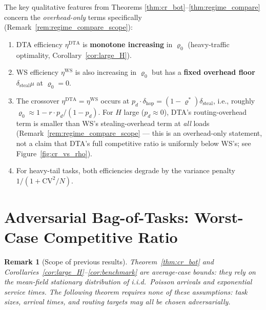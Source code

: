 \documentclass[11pt,a4paper]{article}
\newtheorem{remark}{Remark}[section]
\begin{document}
The key qualitative features from Theorems \ref{thm:cr_bot}--\ref{thm:regime_compare}
concern the \emph{overhead-only} terms specifically (Remark~\ref{rem:regime_compare_scope}):
\begin{enumerate}
  \item DTA efficiency $\eta^{\mathrm{DTA}}$ is \textbf{monotone increasing} in $\varrho_0$
        (heavy-traffic optimality, Corollary~\ref{cor:large_H}).
  \item WS efficiency $\eta^{\mathrm{WS}}$ is also increasing in $\varrho_0$
        but has a \textbf{fixed overhead floor} $\delta_{\mathrm{steal}}\mu$ at $\varrho_0 = 0$.
  \item The crossover $\eta^{\mathrm{DTA}} = \eta^{\mathrm{WS}}$ occurs at
        $p_d \cdot \delta_{\mathrm{hop}} = (1-\varrho^*)\delta_{\mathrm{steal}}$,
        i.e., roughly $\varrho_0 \approx 1 - r\cdot p_d/(1-p_d)$.
        For $H$ large ($p_d \approx 0$), DTA's routing-overhead term is smaller
        than WS's stealing-overhead term at \emph{all} loads (Remark~\ref{rem:regime_compare_scope}
        --- this is an overhead-only statement, not a claim that DTA's full
        competitive ratio is uniformly below WS's; see Figure~\ref{fig:cr_vs_rho}).
  \item For heavy-tail tasks, both efficiencies degrade by the variance penalty $1/(1+\mathrm{CV}^2/N)$.
\end{enumerate}


\section{Adversarial Bag-of-Tasks: Worst-Case Competitive Ratio}
\label{sec:cr_bot_worst}

\begin{remark}[Scope of previous results]
Theorem~\ref{thm:cr_bot} and Corollaries~\ref{cor:large_H}--\ref{cor:benchmark}
are \emph{average-case} bounds: they rely on the mean-field stationary
distribution of i.i.d.\ Poisson arrivals and exponential service times.
The following theorem requires \emph{none} of these assumptions: task sizes,
arrival times, and routing targets may all be chosen adversarially.
\end{remark}
\end{document}
